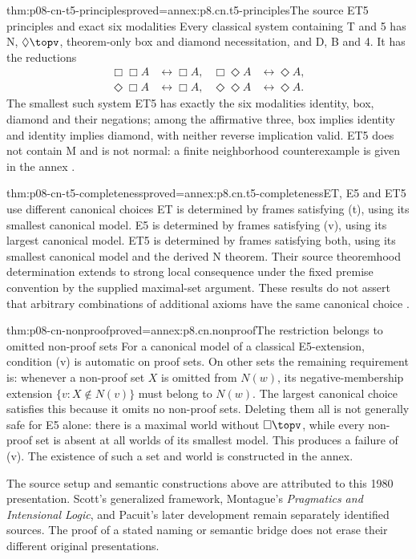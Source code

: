 \begin{hbtheorem}{thm:p08-cn-t5-principles}{proved=annex:p8.cn.t5-principles}{The source ET5 principles and exact six modalities}
Every classical system containing T and 5 has N,
\(\Diamond\topv\), theorem-only box and diamond necessitation,
and D, B and 4. It has the reductions
\[
 \begin{aligned}
 \Box\Box A&\leftrightarrow\Box A,&
 \Box\Diamond A&\leftrightarrow\Diamond A,\\
 \Diamond\Box A&\leftrightarrow\Box A,&
 \Diamond\Diamond A&\leftrightarrow\Diamond A.
 \end{aligned}
\]
The smallest such system ET5 has exactly the six modalities
identity, box, diamond and their negations; among the affirmative
three, box implies identity and identity implies diamond, with
neither reverse implication valid. ET5 does not contain M and is
not normal: a finite neighborhood counterexample is given in the annex
\cite[theorems~8.15--8.16; exercise~9.9]{Chellas1980}.
\end{hbtheorem}

\begin{hbtheorem}{thm:p08-cn-t5-completeness}{proved=annex:p8.cn.t5-completeness}{ET, E5 and ET5 use different canonical choices}
ET is determined by frames satisfying (t), using its smallest
canonical model. E5 is determined by frames satisfying (v), using
its largest canonical model. ET5 is determined by frames satisfying
both, using its smallest canonical model and the derived N theorem.
Their source theoremhood determination extends to strong local
consequence under the fixed premise convention by the supplied
maximal-set argument. These results do not assert that arbitrary
combinations of additional axioms have the same canonical choice
\cite[theorems~9.17--9.21, pp.~262--263]{Chellas1980}.
\end{hbtheorem}

\begin{hbtheorem}{thm:p08-cn-nonproof}{proved=annex:p8.cn.nonproof}{The restriction belongs to omitted non-proof sets}
For a canonical model of a classical E5-extension, condition (v)
is automatic on proof sets. On other sets the remaining requirement
is: whenever a non-proof set \(X\) is omitted from \(N(w)\),
its negative-membership extension \(\{v:X\notin N(v)\}\)
must belong to \(N(w)\). The largest canonical choice satisfies
this because it omits no non-proof sets. Deleting them all is not
generally safe for E5 alone: there is a maximal world without
\(\Box\topv\), while every non-proof set is absent at all
worlds of its smallest model. This produces a failure of (v).
The existence of such a set and world is constructed in the annex.
\end{hbtheorem}

The source setup and semantic constructions above are attributed to
this 1980 presentation. Scott's generalized framework, Montague's
\emph{Pragmatics and Intensional Logic}, and Pacuit's later development
remain separately identified sources. The proof of a stated naming
or semantic bridge does not erase their different original presentations.
